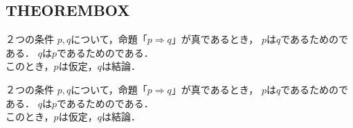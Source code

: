 \documentclass[../main]{subfiles}
\begin{document}
\subsection{THEOREMBOX}
\begin{THEOREMBOX}[命題と条件]
    ２つの条件 $p,q$について，命題「$p \Rightarrow q$」が真であるとき，
    $p$は$q$であるためのである．
    $q$は$p$であるためのである． \\
    このとき，$p$は仮定，$q$は結論．
\end{THEOREMBOX}
\begin{code}[language=tex]
\begin{THEOREMBOX}[命題と条件]
    ２つの条件 $p,q$について，命題「$p \Rightarrow q$」が真であるとき，
    $p$は$q$であるためのである．
    $q$は$p$であるためのである． \\
    このとき，$p$は仮定，$q$は結論．
\end{THEOREMBOX}
\end{code}

\leaderfill
\end{document}
